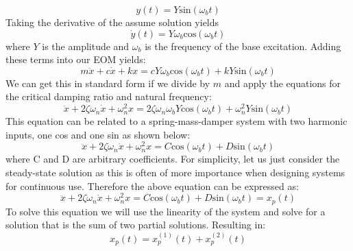 \documentclass[12pt,letter]{article}
\numberwithin{ex}{section} %
\begin{document}
\begin{equation}
y(t) = Y\text{sin}(\omega_b t)
\end{equation}
Taking the derivative of the assume solution yields
\begin{equation}
\dot{y}(t) = Y \omega_b \text{cos}(\omega_b t)
\end{equation}
where $Y$ is the amplitude and $\omega_b$ is the frequency of the base excitation. Adding these terms into our EOM yields:
\begin{equation}
m\ddot{x} + c\dot{x} + kx = c Y \omega_b \text{cos}(\omega_b t)  + k Y\text{sin}(\omega_b t)  
\end{equation}
We can get this in standard form if we divide by $m$ and apply the equations for the critical damping ratio and natural frequency:
\begin{equation}
\ddot{x} + 2 \zeta \omega_n \dot{x} + \omega_n^2x = 2 \zeta \omega_n \omega_b Y \text{cos}(\omega_b t)  + \omega_n^2 Y\text{sin}(\omega_b t)  
\end{equation}
This equation can be related to a spring-mass-damper system with two harmonic inputs, one cos and one sin as shown below:
\begin{equation}
\ddot{x} + 2 \zeta \omega_n \dot{x} + \omega_n^2x = C \text{cos}(\omega_b t)  + D \text{sin}(\omega_b t)  
\end{equation}
where C and D are arbitrary coefficients. For simplicity, let us just consider the steady-state solution as this is often of more importance when designing systems for continuous use. Therefore the above equation can be expressed as:
\begin{equation}
\ddot{x} + 2 \zeta \omega_n \dot{x} + \omega_n^2x = C \text{cos}(\omega_b t)  + D \text{sin}(\omega_b t)  = x_p(t) 
\end{equation}
To solve this equation we will use the linearity of the system and solve for a solution that is the sum of two partial solutions. Resulting in:
\begin{equation}
 x_p(t) = 	x_p^{(1)}(t) + 	x_p^{(2)}(t)  
\end{equation}
\end{document}
